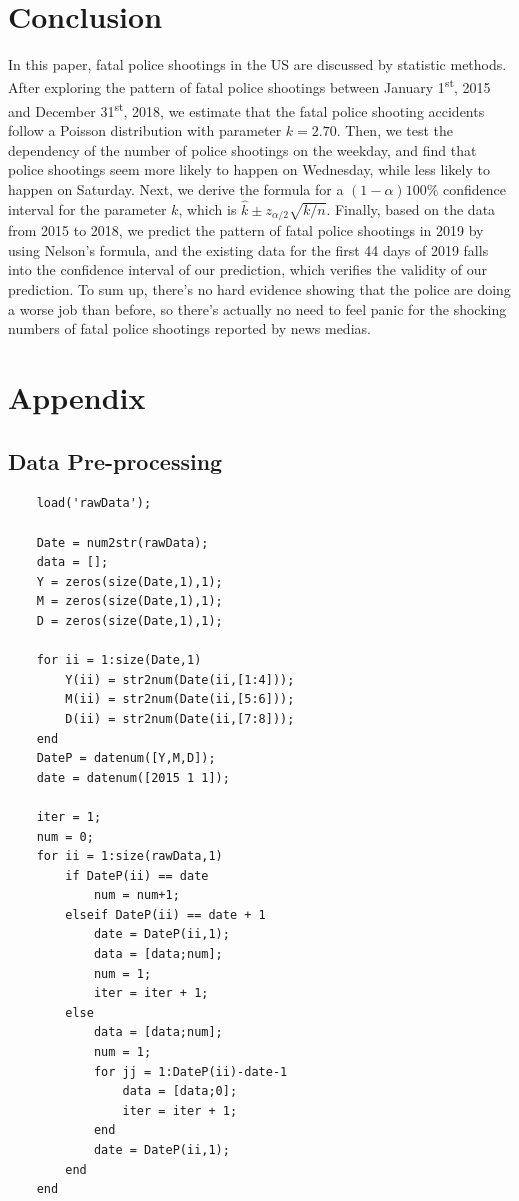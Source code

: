 \documentclass[a4paper]{article}
\begin{document}
{{\section{Conclusion}
\par{In this paper, fatal police shootings in the US are discussed by statistic methods. After exploring the pattern of fatal police shootings between January  1\textsuperscript{st}, 2015 and December 31\textsuperscript{st}, 2018, we estimate that the fatal police shooting accidents follow a Poisson distribution with parameter $k = 2.70$. Then, we test the dependency of the number of police shootings on the weekday, and find that police shootings seem more likely to happen on Wednesday, while less likely to happen on Saturday. Next, we derive the formula for a $(1-\alpha)100\%$ confidence interval for the parameter $k$, which is $\hat{k} \pm z_{\alpha/2}\sqrt{k/n}$. Finally, based on the data from 2015 to 2018, we predict the pattern of fatal police shootings in 2019 by using Nelson's formula, and the existing data for the first 44 days of 2019 falls into the confidence interval of our prediction, which verifies the validity of our prediction. To sum up, there's no hard evidence showing that the police are doing a worse job than before, so there's actually no need to feel panic for the shocking numbers of fatal police shootings reported by news medias.
}

\newpage
\section{Appendix}
\subsection{Data Pre-processing}
\begin{verbatim}
    load('rawData');
    
    Date = num2str(rawData);
    data = [];
    Y = zeros(size(Date,1),1);
    M = zeros(size(Date,1),1);
    D = zeros(size(Date,1),1);
    
    for ii = 1:size(Date,1)
        Y(ii) = str2num(Date(ii,[1:4]));
        M(ii) = str2num(Date(ii,[5:6]));
        D(ii) = str2num(Date(ii,[7:8]));
    end
    DateP = datenum([Y,M,D]);
    date = datenum([2015 1 1]);
    
    iter = 1;
    num = 0;
    for ii = 1:size(rawData,1)
        if DateP(ii) == date
            num = num+1;
        elseif DateP(ii) == date + 1
            date = DateP(ii,1);
            data = [data;num];
            num = 1;
            iter = iter + 1;
        else
            data = [data;num];
            num = 1;
            for jj = 1:DateP(ii)-date-1
                data = [data;0];
                iter = iter + 1;
            end
            date = DateP(ii,1);
        end
    end
    

\end{verbatim}}}
\end{document}
